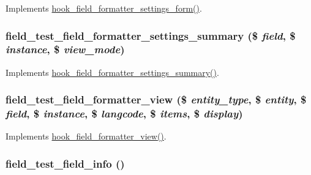 \label{field__test_8field_8inc_aae6632286258431d3932e251212026d3}
Implements \hyperlink{group__field__types_gaf9b6aefe0b4fe6c03ebd5bd9bd1b891b}{hook\_\-field\_\-formatter\_\-settings\_\-form()}. \hypertarget{field__test_8field_8inc_ad80cc548d9fa0d3998c09fe7e60f224a}{
\subsubsection[{field\_\-test\_\-field\_\-formatter\_\-settings\_\-summary}]{\setlength{\rightskip}{0pt plus 5cm}field\_\-test\_\-field\_\-formatter\_\-settings\_\-summary (\$ {\em field}, \/  \$ {\em instance}, \/  \$ {\em view\_\-mode})}}
\label{field__test_8field_8inc_ad80cc548d9fa0d3998c09fe7e60f224a}
Implements \hyperlink{group__field__types_ga0cdef0fb8588dde07292df1b86f06d81}{hook\_\-field\_\-formatter\_\-settings\_\-summary()}. \hypertarget{field__test_8field_8inc_a6a36c6ce525d35e0e3e70e00b154f491}{
\subsubsection[{field\_\-test\_\-field\_\-formatter\_\-view}]{\setlength{\rightskip}{0pt plus 5cm}field\_\-test\_\-field\_\-formatter\_\-view (\$ {\em entity\_\-type}, \/  \$ {\em entity}, \/  \$ {\em field}, \/  \$ {\em instance}, \/  \$ {\em langcode}, \/  \$ {\em items}, \/  \$ {\em display})}}
\label{field__test_8field_8inc_a6a36c6ce525d35e0e3e70e00b154f491}
Implements \hyperlink{group__field__formatter_gaa588d99481fa147a1c88416e55fdfad6}{hook\_\-field\_\-formatter\_\-view()}. \hypertarget{field__test_8field_8inc_a2ca4cc9829f50f1b4af62c7dd0deedd8}{
\subsubsection[{field\_\-test\_\-field\_\-info}]{\setlength{\rightskip}{0pt plus 5cm}field\_\-test\_\-field\_\-info ()}}

